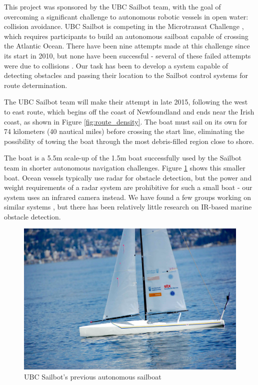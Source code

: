 This project was sponsored by the UBC Sailbot team, with the goal of overcoming a significant challenge to autonomous robotic vessels in open water: collision avoidance. UBC Sailbot is competing in the Microtransat Challenge \cite{transat-history}, which requires participants to build an autonomous sailboat capable of crossing the Atlantic Ocean.  There have been nine attempts made at this challenge since its start in 2010, but none have been successful - several of these failed attempts were due to collisions \cite{transat-history}.  Our task has been to develop a system capable of detecting obstacles and passing their location to the Sailbot control systems for route determination.

The UBC Sailbot team will make their attempt in late 2015, following the west to east route, which begins off the coast of Newfoundland and ends near the Irish coast, as shown in Figure \ref{fig:route_density}. The boat must sail on its own for 74 kilometers (40 nautical miles) before crossing the start line, eliminating the possibility of towing the boat through the most debris-filled region close to shore.

The boat is a 5.5m scale-up of the 1.5m boat successfully used by the Sailbot team in shorter autonomous navigation challenges. Figure \ref{fig:sailbot} shows this smaller boat.  Ocean vessels typically use radar for obstacle detection, but the power and weight requirements of a radar system are prohibitive for such a small boat - our system uses an infrared camera instead. We have found a few groups working on similar systems \cite{ODU-boat-IR-detection}, but there has been relatively little research on IR-based marine obstacle detection.

\begin{figure}
\includegraphics[width=120mm,natwidth=1203,natheight=627]{"./image/sailbot"}
\caption[UBC Sailbot's Previous Boat.]{\label{fig:sailbot}UBC Sailbot's previous autonomous sailboat \cite{ubc-sailbot__image}}
\end{figure}

